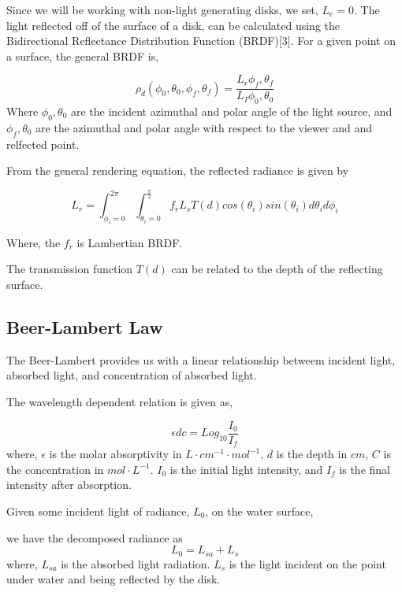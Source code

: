 \documentclass{article}
\begin{document}
Since we will be working with non-light generating disks, we set,
$ L_e = 0$.
The light reflected off of the surface of a disk, can be calculated using the
Bidirectional Reflectance Distribution Function (BRDF)[3].
For a given point on a surface, the general BRDF is,

\begin{equation}
\rho_d(\phi_0, \theta_0,\phi_f, \theta_f)=\frac{L_r{\phi_f, \theta_f}}{L_I{\phi_0, \theta_0}}
\end{equation}
Where $\phi_0, \theta_0$ are the incident azimuthal and polar angle of the light source,
and $\phi_f, \theta_0$ are the azimuthal and polar angle with respect to the viewer and
and relfected point.

From the general rendering equation, the reflected radiance is given by

\begin{equation}
  L_r = \int^{2\pi}_{\phi_i = 0}\int^{\frac{\pi}{2}}_{\theta_i = 0}
  f_r L_s T(d)cos(\theta_i)sin(\theta_i)d\theta_i d\phi_i
\end{equation}

Where, the $ f_r$ is Lambertian BRDF.

The transmission function $T(d)$ can be related to the depth of the reflecting
surface.

\subsection{Beer-Lambert Law}

The Beer-Lambert provides us with a linear relationship betweem incident light, absorbed light,
and concentration of absorbed light.

The wavelength dependent relation is given as,

\begin{equation}
  \epsilon d c = Log_{10}{\frac{I_0}{I_f}}
\end{equation}
where, $\epsilon$ is the molar absorptivity in $ L \cdot cm^{-1} \cdot mol^{-1}$,
$ d$ is the depth in $cm$, $ C$ is the concentration in $mol \cdot L^{-1} $. $ I_0$
is the initial light intensity, and $ I_f$ is the final intensity after
absorption.

Given some incident light of radiance, $L_0$, on the water surface,

we have the decomposed radiance as
$$ L_0 = L_{sa} + L_{s}$$
where, $ L_{sa}$ is the absorbed light radiation. $ L_{s}$ is the light
incident on the point under water and being reflected by the disk.
\end{document}
